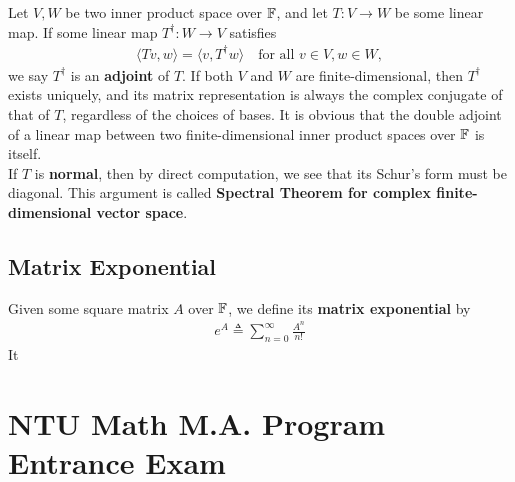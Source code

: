 \documentclass{report}
\begin{document}
\begin{mdframed}
Let $V,W$ be two inner product space over  $\mathbb{F}$, and let  $T:V\rightarrow W$ be some linear map. If some linear map $T^\dagger:W\rightarrow V$ satisfies 
\begin{align*}
\langle Tv,w\rangle = \langle v,T^\dagger w\rangle \quad\text{for all }v\in V,w\in W, 
\end{align*}
we say $T^\dagger $ is an  \textbf{adjoint} of $T$. If both $V$ and $W$ are finite-dimensional, then $T^\dagger $ exists uniquely, and its matrix representation is always the complex conjugate of that of $T$, regardless of the choices of bases. It is obvious that the double adjoint of a linear map between two finite-dimensional inner product spaces over $\mathbb{F}$ is itself.\\

If $T$ is \textbf{normal}, then by direct computation, we see that its Schur's form must be diagonal. This argument is called \textbf{Spectral Theorem for complex finite-dimensional vector space}.\\








\end{mdframed}
\section{Matrix Exponential}
\begin{mdframed}
Given some square matrix $A$ over  $\mathbb{F}$, we define its  \textbf{matrix exponential} by 
\begin{align*}
e^A \triangleq \sum_{n=0}^{\infty} \frac{A^n}{n!}
\end{align*}
It 
\end{mdframed}
\chapter{NTU Math M.A. Program Entrance Exam} 
\end{document}
